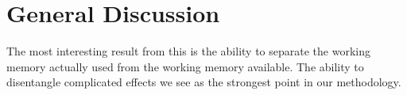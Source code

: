 \section{General Discussion}
The most interesting result from this is the ability to separate the working memory actually used from the working memory available. The ability to disentangle complicated effects we see as the strongest point in our methodology. 